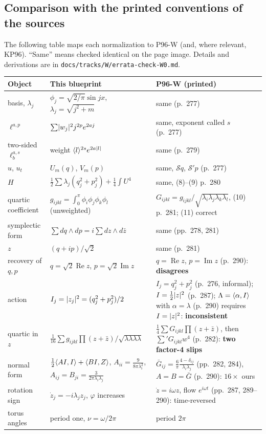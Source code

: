 \subsection{Comparison with the printed conventions of the sources}\label{bpW:w0:table}

The following table maps each normalization to P96-W (and, where relevant, KP96). ``Same'' means checked identical on
the page image. Details and derivations are in \texttt{docs/tracks/W/errata-check-W0.md}.

\medskip
{\small
\noindent\begin{tabular}{@{}p{}p{}p{}@{}}
\toprule
Object & This blueprint & P96-W (printed) \\
\midrule
basis, $\lambda_j$ & $\phi_j=\sqrt{2/\pi}\sin jx$, $\lambda_j=\sqrt{j^2+m}$ & same (p.~277)\\
$\ell^{a,p}$ & $\sum\lvert w_j\rvert^2j^{2p}e^{2aj}$ & same, exponent called $s$ (p.~277)\\
two-sided $\ell^{a,s}_b$ & weight $\langle l\rangle^{2s}e^{2a\lvert l\rvert}$ & same (p.~279)\\
$u$, $u_t$ & $U_m(q)$, $V_m(p)$ & same, $\mathcal Sq$, $\mathcal S'p$ (p.~277)\\
$H$ & $\frac12\sum\lambda_j(q_j^2+p_j^2)+\frac14\int U^4$ & same, (8)--(9) p.~280\\
quartic coefficient & $g_{ijkl}=\int_0^\pi\phi_i\phi_j\phi_k\phi_l$ (unweighted) & $G_{ijkl}=g_{ijkl}/\sqrt{\lambda_i\lambda_j\lambda_k\lambda_l}$, (10) p.~281; (11) correct\\
symplectic form & $\sum dq\wedge dp=i\sum dz\wedge d\bar z$ & same (pp.~278, 281)\\
$z$ & $(q+ip)/\sqrt2$ & same (p.~281)\\
recovery of $q,p$ & $q=\sqrt2\operatorname{Re}z$, $p=\sqrt2\operatorname{Im}z$ & $q=\operatorname{Re}z$, $p=\operatorname{Im}z$ (p.~290): \textbf{disagrees}\\
action & $I_j=\lvert z_j\rvert^2=(q_j^2+p_j^2)/2$ & $I_j=q_j^2+p_j^2$ (p.~276, informal); $I=\frac12\lvert z\rvert^2$ (p.~287); $\Lambda=\langle \alpha,I\rangle$ with $\alpha=\lambda$ (p.~290) requires $I=\lvert z\rvert^2$: \textbf{inconsistent}\\
quartic in $z$ & $\frac1{16}\sum g_{ijkl}\prod(z+\bar z)/\sqrt{\lambda\lambda\lambda\lambda}$ & $\frac14\sum G_{ijkl}\prod(z+\bar z)$, then $\sum' G_{ijkl}w^4$ (p.~282): \textbf{two factor-4 slips}\\
normal form & $\frac12\langle AI,I\rangle+\langle BI,Z\rangle$, $A_{ii}=\frac{9}{8\pi\lambda_i^2}$, $A_{ij}=B_{ji}=\frac{3}{2\pi\lambda_i\lambda_j}$ & $\bar G_{ij}=\frac6\pi\frac{4-\delta_{ij}}{\lambda_i\lambda_j}$ (pp.~282, 284), $A=B=\bar G$ (p.~290): $16\times$ ours\\
rotation sign & $\dot z_j=-i\lambda_jz_j$, $\varphi$ increases & $\dot z=i\omega z$, flow $e^{i\omega t}$ (pp.~287, 289--290): time-reversed\\
torus angles & period one, $\nu=\omega/2\pi$ & period $2\pi$\\
\bottomrule
\end{tabular}}

